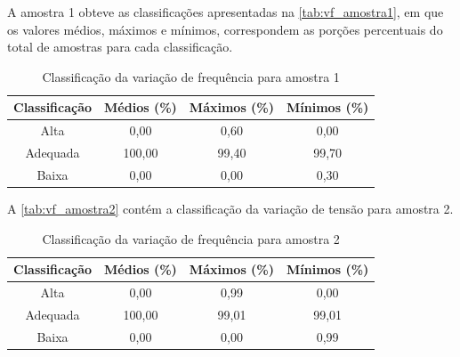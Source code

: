 A amostra 1 obteve as classificações apresentadas na \autoref{tab:vf_amostra1}, em que os valores médios, máximos e mínimos, correspondem as porções percentuais do total de amostras para cada classificação.

\begin{table}[H]
  \centering
  \caption{Classificação da variação de frequência para amostra 1}
  \label{tab:vf_amostra1}
  \begin{tabular}{@{}cccc@{}}
    \toprule
    Classificação & Médios (\%) & Máximos (\%) & Mínimos (\%) \\
    \midrule
    Alta & 0,00 & 0,60 & 0,00 \\
    Adequada & 100,00 & 99,40 & 99,70 \\
    Baixa & 0,00 & 0,00 & 0,30 \\
    \bottomrule
  \end{tabular}
\end{table}

A \autoref{tab:vf_amostra2} contém a classificação da variação de tensão para amostra 2.

\begin{table}[H]
  \centering
  \caption{Classificação da variação de frequência para amostra 2}
  \label{tab:vf_amostra2}
  \begin{tabular}{@{}cccc@{}}
    \toprule
    Classificação & Médios (\%) & Máximos (\%) & Mínimos (\%) \\
    \midrule
    Alta & 0,00 & 0,99 & 0,00 \\
    Adequada & 100,00 & 99,01 & 99,01 \\
    Baixa & 0,00 & 0,00 & 0,99 \\
    \bottomrule
  \end{tabular}
\end{table}
